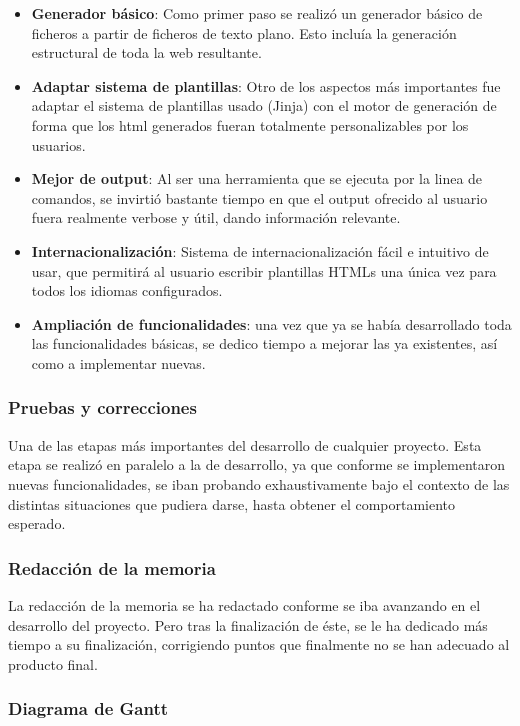 \documentclass[a4paper,12pt]{article}
\begin{document}
\begin{itemize}
\item \textbf{Generador básico}: Como primer paso se realizó un generador básico de ficheros a partir
de ficheros de texto plano. Esto incluía la generación estructural de toda la web resultante.
\item \textbf{Adaptar sistema de plantillas}: Otro de los aspectos más importantes fue adaptar el sistema
de plantillas usado (Jinja) con el motor de generación de forma que los html generados fueran totalmente
personalizables por los usuarios.
\item \textbf{Mejor de output}: Al ser una herramienta que se ejecuta por la linea de comandos, se invirtió
bastante tiempo en que el output ofrecido al usuario fuera realmente verbose y útil, dando información relevante.
\item \textbf{Internacionalización}: Sistema de internacionalización fácil e intuitivo de usar, que permitirá al usuario
escribir plantillas HTMLs una única vez para todos los idiomas configurados.
\item \textbf{Ampliación de funcionalidades}: una vez que ya se había desarrollado toda las funcionalidades básicas,
se dedico tiempo a mejorar las ya existentes, así como a implementar nuevas.
\end{itemize}


\subsubsection{Pruebas y correcciones}

Una de las etapas más importantes del desarrollo de cualquier proyecto. Esta etapa se realizó en paralelo
a la de desarrollo, ya que conforme se implementaron nuevas funcionalidades, se iban probando exhaustivamente
bajo el contexto de las distintas situaciones que pudiera darse, hasta obtener el comportamiento
esperado.

\subsubsection{Redacción de la memoria}

La redacción de la memoria se ha redactado conforme se iba avanzando en el desarrollo del proyecto.
Pero tras la finalización de éste, se le ha dedicado más tiempo a su finalización, corrigiendo puntos que
finalmente no se han adecuado al producto final.

\subsubsection{Diagrama de Gantt}
\end{document}
